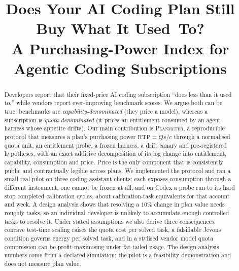 \documentclass[conference]{IEEEtran}
\theoremstyle{plain}
\theoremstyle{definition}
\newcommand{\RTP}{\ensuremath{\mathrm{RTP}}}
\begin{document}
\title{Does Your AI Coding Plan Still Buy What It Used~To? \\
A Purchasing-Power Index for Agentic Coding Subscriptions}

\author{
}

\maketitle

\begin{abstract}
Developers report that their fixed-price AI coding subscription ``does less
than it used to,'' while vendors report ever-improving benchmark scores. We
argue both can be true: benchmarks are \emph{capability-denominated} (they
price a model), whereas a subscription is \emph{quota-denominated} (it prices
an entitlement consumed by an agent harness whose appetite drifts). Our main
contribution is \textsc{Planmeter}, a reproducible protocol that measures a
plan's purchasing power $\RTP=Qs/c$ through a normalised quota unit, an
entitlement probe, a frozen harness, a drift canary and pre-registered
hypotheses, with an exact additive decomposition of its log change into
entitlement, capability, consumption and price. Price is the only component
that is consistently public and contractually legible across plans. We
implemented the protocol and ran a small real pilot on three coding-assistant
clients: each exposes consumption through a different instrument, one cannot be
frozen at all, and on Codex a probe run to its hard stop completed
\codexProbeCycles{} calibration cycles, about \codexProbeQ{}
calibration-task equivalents for that account and week. A design analysis shows
that resolving a $10\%$ change in plan value needs roughly \nReqTen{} tasks, so
an individual developer is unlikely to accumulate enough controlled tasks to
resolve it. Under stated assumptions we also derive three consequences:
concave test-time scaling raises the quota cost per solved task, a falsifiable
Jevons condition governs energy per solved task, and in a stylised vendor model
quota compression can be profit-maximising under fat-tailed usage. The
design-analysis numbers come from a declared simulation; the pilot is a
feasibility demonstration and does not measure plan value.
\end{abstract}
\end{document}
